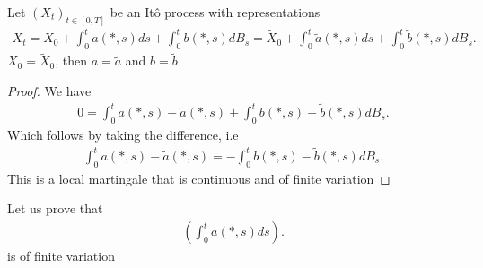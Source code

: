 \begin{lemma}
  Let $(X_t)_{t \in  [0,T]}$  be an It\^o process with representations 
  \begin{align*}
    X_t = X_{0} + \int_0^{t} a(*,s) ds + \int_0^{t} b(*,s) dB_s = \tilde{X}_0 + \int_0^{t} \tilde{a}(*,s) ds + \int_0^{t} \tilde{b}(*,s)dB_s      
  .\end{align*}
  $X_0 = \tilde{X}_0 $, then $a = \tilde{a} $ and $b = \tilde{b} $
\end{lemma}
\begin{proof}
 We have 
 \begin{align*}
  0 =  \int_0^{t} a(*,s) - \tilde{a}(*,s)  +   \int_0^{t} b(*,s)-\tilde{b}(*,s)  dB_s
 .\end{align*}
 Which follows by taking the difference, i.e 
 \begin{align*}
   \int_0^{t} a(*,s) - \tilde{a}(*,s)  = -  \int_0^{t} b(*,s)-\tilde{b}(*,s)  dB_s
 .\end{align*}
  This is a local martingale that is continuous and of finite variation
\end{proof}
Let us prove that 
\begin{align*}
  (\int_0^{t} a(*,s) ds )
.\end{align*}
is of finite variation
